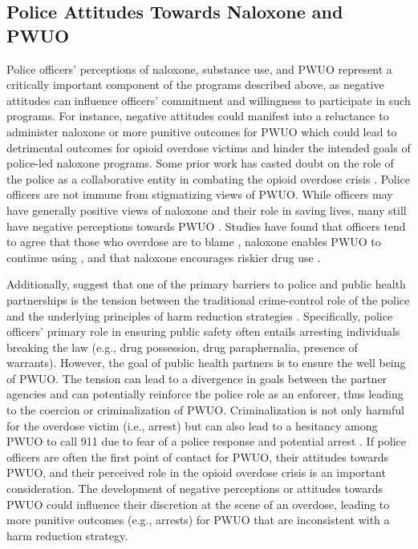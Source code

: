 \subsection{Police Attitudes Towards Naloxone and PWUO}
Police officers’ perceptions of naloxone, substance use, and PWUO represent a critically important component of the programs described above, as negative attitudes can influence officers’ commitment and willingness to participate in such programs. For instance, negative attitudes could manifest into a reluctance to administer naloxone or more punitive outcomes for PWUO which could lead to detrimental outcomes for opioid overdose victims and hinder the intended goals of police-led naloxone programs. Some prior work has casted doubt on the role of the police as a collaborative entity in combating the opioid overdose crisis \parencite{carroll_police_2023}. Police officers are not immune from stigmatizing views of PWUO. While officers may have generally positive views of naloxone and their role in saving lives, many still have negative perceptions towards PWUO \parencite{barry_stigma_2014, calabrese_opposition_2019}. Studies have found that officers tend to agree that those who overdose are to blame \parencite{beletsky_attitudes_2005, wagner_training_2016}, naloxone enables PWUO to continue using \parencite{banta-green_police_2013, burris_stopping_2009, reichert_police_2023}, and that naloxone encourages riskier drug use \parencite{saunders_you_2019}. 

Additionally, \textcite{carroll_police_2023} suggest that one of the primary barriers to police and public health partnerships is the tension between the traditional crime-control role of the police and the underlying principles of harm reduction strategies \parencite{wright_aiding_2024}. Specifically, police officers' primary role in ensuring public safety often entails arresting individuals breaking the law (e.g., drug possession, drug paraphernalia, presence of warrants). However, the goal of public health partners is to ensure the well being of PWUO. The tension can lead to a divergence in goals between the partner agencies and can potentially reinforce the police role as an enforcer, thus leading to the coercion or criminalization of PWUO. Criminalization is not only harmful for the overdose victim (i.e., arrest) but can also lead to a hesitancy among PWUO to call 911 due to fear of a police response and potential arrest \parencite{bohnert_policing_2011}. If police officers are often the first point of contact for PWUO, their attitudes towards PWUO, and their perceived role in the opioid overdose crisis is an important consideration. The development of negative perceptions or attitudes towards PWUO could influence their discretion at the scene of an overdose, leading to more punitive outcomes (e.g., arrests) for PWUO that are inconsistent with a harm reduction strategy.

